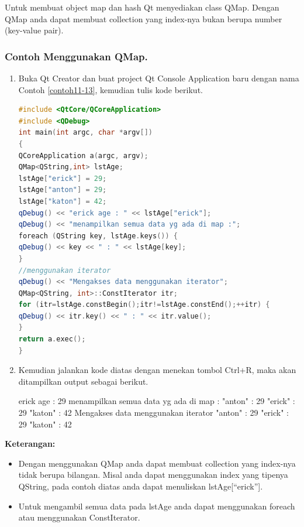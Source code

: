 Untuk membuat object map dan hash Qt menyediakan class QMap. Dengan QMap
anda dapat membuat collection yang index-nya bukan berupa number
(key-value pair).

\subsubsection*{Contoh  Menggunakan QMap.}

\begin{enumerate}

\item
  Buka Qt Creator dan buat project Qt Console Application baru dengan
  nama Contoh \ref{contoh11-13}, kemudian tulis kode berikut.

\begin{lstlisting}[language=c++, caption=Menggunakan QMap, label=contoh11-13]
#include <QtCore/QCoreApplication>
#include <QDebug>
int main(int argc, char *argv[])
{
QCoreApplication a(argc, argv);
QMap<QString,int> lstAge;
lstAge["erick"] = 29;
lstAge["anton"] = 29;
lstAge["katon"] = 42;
qDebug() << "erick age : " << lstAge["erick"];
qDebug() << "menampilkan semua data yg ada di map :";
foreach (QString key, lstAge.keys()) {
qDebug() << key << " : " << lstAge[key];
}
//menggunakan iterator
qDebug() << "Mengakses data menggunakan iterator";
QMap<QString, int>::ConstIterator itr;
for (itr=lstAge.constBegin();itr!=lstAge.constEnd();++itr) {
qDebug() << itr.key() << " : " << itr.value();
}
return a.exec();
}
\end{lstlisting}
\item
  Kemudian jalankan kode diatas dengan menekan tombol Ctrl+R, maka akan
  ditampilkan output sebagai berikut.

\begin{lcverbatim}
erick age :  29
menampilkan semua data yg ada di map :
"anton"  :  29
"erick"  :  29
"katon"  :  42
Mengakses data menggunakan iterator
"anton"  :  29
"erick"  :  29
"katon"  :  42
\end{lcverbatim}

\end{enumerate}

\textbf{Keterangan:}

\begin{itemize}

\item
  Dengan menggunakan QMap anda dapat membuat collection yang index-nya
  tidak berupa bilangan. Misal anda dapat menggunakan index yang tipenya
  QString, pada contoh diatas anda dapat menuliskan
  lstAge{[}``erick''{]}.
\item
  Untuk mengambil semua data pada lstAge anda dapat menggunakan foreach
  atau menggunakan ConstIterator.
\end{itemize}
